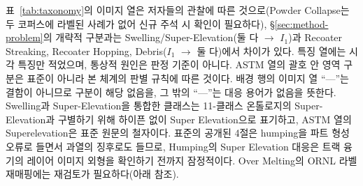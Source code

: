 표~\ref{tab:taxonomy}의 이미지 열은 저자들의 관찰에 따른 것으로(Powder
Collapse는 두 코퍼스에 라벨된 사례가 없어 신규 주석 시 확인이
필요하다), \S\ref{sec:method-problem}의 개략적 구분과는
Swelling/Super-Elevation(둘 다 $\rightarrow$ $I_1$)과 Recoater
Streaking, Recoater Hopping, Debris($I_1$ $\rightarrow$ 둘 다)에서
차이가 있다. 특징 열에는 시각 특징만 적었으며, 통상적 원인은 판정
기준이 아니다. ASTM 열의 괄호 안 영역 구분은 표준이 아니라 본 체계의
판별 규칙에 따른 것이다. 배경 행의 이미지 열 ``---''는 결함이
아니므로 구분이 해당 없음을, 그 밖의 ``---''는 대응 용어가 없음을
뜻한다. Swelling과 Super-Elevation을 통합한 클래스는 11-클래스
온톨로지의 Super-Elevation과 구별하기 위해 하이픈 없이 Super
Elevation으로 표기하고, ASTM 열의 Superelevation은 표준 원문의
철자이다. 표준의 공개된 4절은 humping을 파트 형성 오류로 들면서
과열의 징후로도 들므로, Humping의 Super Elevation 대응은 트랙 융기의
레이어 이미지 외형을 확인하기 전까지 잠정적이다. Over Melting의 ORNL
라벨 재매핑에는 재검토가 필요하다(아래 참조).

